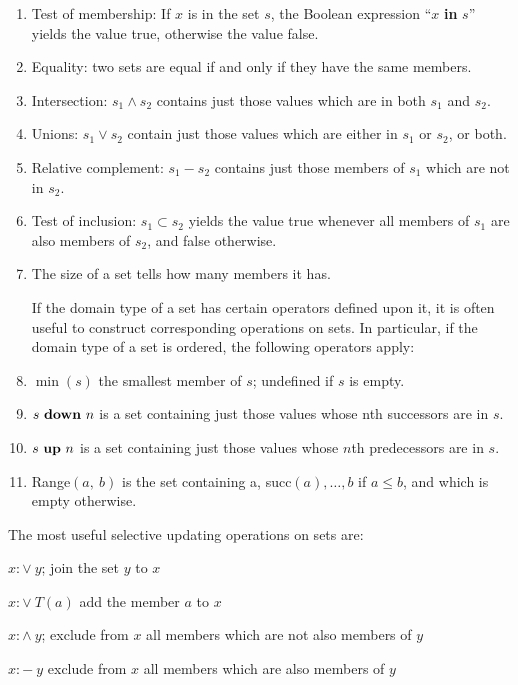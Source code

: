 \begin{enumerate}[wide, nosep, label=(\arabic*)]
	\item Test of membership: If $x$ is in the set $s$, the Boolean expression ``$x$ \textbf{in} $s$'' yields the value true, otherwise the value false.
	\item Equality: two sets are equal if and only if they have the same members.
	\item Intersection: $s_1 \wedge s_2$ contains just those values which are in both $s_1$ and $s_2$.
	\item Unions: $s_1 \vee s_2$ contain just those values which are either in $s_1$ or $s_2$, or both.
	\item Relative complement: $s_1 - s_2$ contains just those members of $s_1$ which are not in $s_2$.
	\item Test of inclusion: $s_1 \subset s_2$ yields the value true whenever all members of $s_1$ are also members of $s_2$, and false otherwise.
	\item The size of a set tells how many members it has.

	If the domain type of a set has certain operators defined upon it, it is often useful to construct corresponding operations on sets. In particular, if the domain type of a set is ordered, the following operators apply:

	\item $\min(s)$ the smallest member of $s$; undefined if $s$ is empty.
	\item $s \text{ \textbf{down} } n$ is a set containing just those values whose nth successors are in $s$.
	\item $s \text{ \textbf{up} } n$ is a set containing just those values whose $n$th predecessors are in $s$.
	\item Range$(a,\ b)$ is the set containing a, succ$(a), \dots, b$ if $a \leqslant b$, and which is empty otherwise.
\end{enumerate}

The most useful selective updating operations on sets are:

\noindent
$x:\vee\ y$; \tabto*{5em} join the set $y$ to $x$

\noindent
$x:\vee\ T(a)$ \tabto*{5em} add the member $a$ to $x$

\noindent
$x:\wedge\ y$; \tabto*{5em} exclude from $x$ all members which are not also members of $y$

\noindent
$x:-\ y$ \tabto*{5em} exclude from $x$ all members which are also members of $y$

